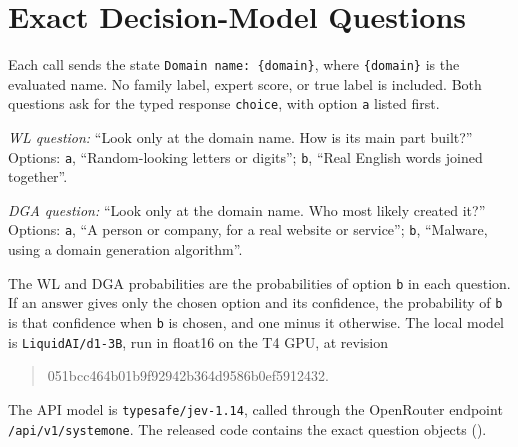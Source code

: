 \section{Exact Decision-Model Questions}
\label{app:questions}

Each call sends the state \texttt{Domain name: \{domain\}}, where \texttt{\{domain\}} is the evaluated name.
No family label, expert score, or true label is included.
Both questions ask for the typed response \texttt{choice}, with option \texttt{a} listed first.

\emph{WL question:} ``Look only at the domain name. How is its main part built?''
Options: \texttt{a}, ``Random-looking letters or digits''; \texttt{b}, ``Real English words joined together''.

\emph{DGA question:} ``Look only at the domain name. Who most likely created it?''
Options: \texttt{a}, ``A person or company, for a real website or service''; \texttt{b}, ``Malware, using a domain generation algorithm''.

The WL and DGA probabilities are the probabilities of option \texttt{b} in each question.
If an answer gives only the chosen option and its confidence, the probability of \texttt{b} is that confidence when \texttt{b} is chosen, and one minus it otherwise.
The local model is \texttt{LiquidAI/d1-3B}, run in float16 on the T4 GPU, at revision
\begin{quote}\ttfamily\footnotesize
051bcc464b01b9f92942b364d9586b0ef5912432.
\end{quote}
The API model is \texttt{typesafe/jev-1.14}, called through the OpenRouter endpoint \texttt{/api/v1/systemone}.
The released code contains the exact question objects ().

